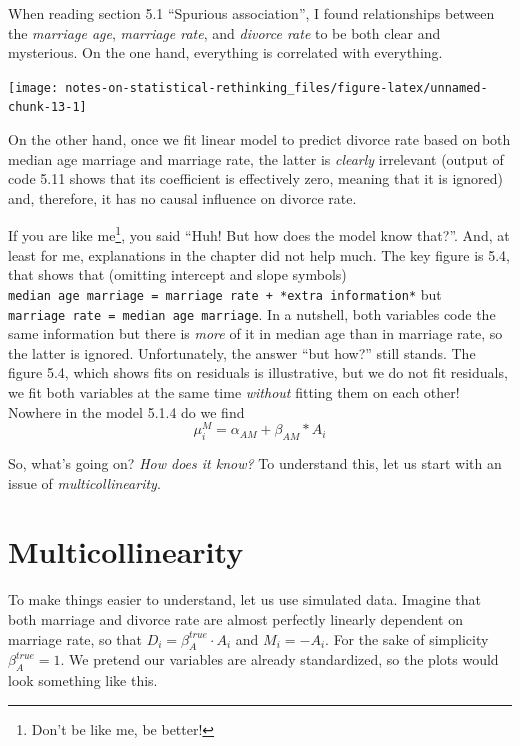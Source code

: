 \documentclass[
]{book}
\begin{document}
When reading section 5.1 ``Spurious association'', I found relationships between the \emph{marriage age}, \emph{marriage rate}, and \emph{divorce rate} to be both clear and mysterious. On the one hand, everything is correlated with everything.

\begin{center}\texttt{[image: notes-on-statistical-rethinking\_files/figure-latex/unnamed-chunk-13-1]} \end{center}

On the other hand, once we fit linear model to predict divorce rate based on both median age marriage and marriage rate, the latter is \emph{clearly} irrelevant (output of code 5.11 shows that its coefficient is effectively zero, meaning that it is ignored) and, therefore, it has no causal influence on divorce rate.

If you are like me\footnote{Don't be like me, be better!}, you said ``Huh! But how does the model know that?''. And, at least for me, explanations in the chapter did not help much. The key figure is 5.4, that shows that (omitting intercept and slope symbols) \texttt{median\ age\ marriage\ =\ marriage\ rate\ +\ *extra\ information*} but \texttt{marriage\ rate\ =\ median\ age\ marriage}. In a nutshell, both variables code the same information but there is \emph{more} of it in median age than in marriage rate, so the latter is ignored. Unfortunately, the answer ``but how?'' still stands. The figure 5.4, which shows fits on residuals is illustrative, but we do not fit residuals, we fit both variables at the same time \emph{without} fitting them on each other! Nowhere in the model 5.1.4 do we find
\[\mu^{M}_{i} = \alpha_{AM} + \beta_{AM} * A_i\]

So, what's going on? \emph{How does it know?} To understand this, let us start with an issue of \emph{multicollinearity}.

\hypertarget{multicollinearity}{%
\section{Multicollinearity}\label{multicollinearity}}

To make things easier to understand, let us use simulated data. Imagine that both marriage and divorce rate are almost perfectly linearly dependent on marriage rate, so that \(D_i = \beta_A^{true} \cdot A_i\) and \(M_i = -A_i\). For the sake of simplicity \(\beta_A^{true} = 1\). We pretend our variables are already standardized, so the plots would look something like this.
\end{document}
